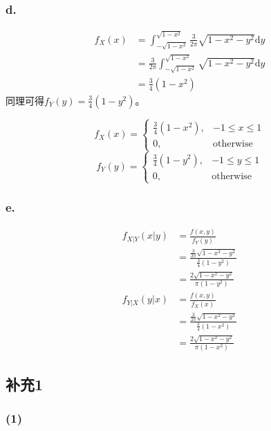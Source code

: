 \documentclass[a4paper,12pt]{ctexart}
\begin{document}
\subsubsection*{d.}

\begin{align*}
	f_X(x) &= \int_{-\sqrt{1-x^2}}^{\sqrt{1-x^2}} \frac{3}{2\pi} \sqrt{1 - x^2 - y^2} \mathrm{d}y \\
	&= \frac{3}{2\pi} \int_{-\sqrt{1-x^2}}^{\sqrt{1-x^2}} \sqrt{1 - x^2 - y^2} \mathrm{d}y \\
	&= \frac{3}{4} (1 - x^2)
\end{align*}
同理可得$f_Y(y) = \frac{3}{4} (1 - y^2)$。

\begin{equation*}
	f_X(x) =
	\begin{cases}
		\frac{3}{4} (1 - x^2), & -1 \leq x \leq 1 \\
		0, & \text{otherwise}
	\end{cases}
\end{equation*}
\begin{equation*}
	f_Y(y) =
	\begin{cases}
		\frac{3}{4} (1 - y^2), & -1 \leq y \leq 1 \\
		0, & \text{otherwise}
	\end{cases}
\end{equation*}

\subsubsection*{e.}

\begin{align*}
	f_{X|Y}(x|y) &= \frac{f(x,y)}{f_Y(y)} \\
	&= \frac{\frac{3}{2\pi} \sqrt{1 - x^2 - y^2}}{\frac{3}{4} (1 - y^2)} \\
	&= \frac{2\sqrt{1 - x^2 - y^2}}{\pi(1 - y^2)} \\
	f_{Y|X}(y|x) &= \frac{f(x,y)}{f_X(x)} \\
	&= \frac{\frac{3}{2\pi} \sqrt{1 - x^2 - y^2}}{\frac{3}{4} (1 - x^2)} \\
	&= \frac{2\sqrt{1 - x^2 - y^2}}{\pi(1 - x^2)}
\end{align*}

\subsection*{补充1}

\subsubsection*{(1)}
\end{document}
